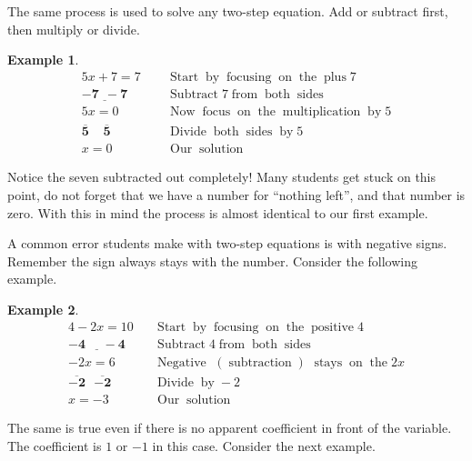 \documentclass[12pt]{book}
\theoremstyle{definition}
\newtheorem{example}{Example}
\newcommand{\tmmathbf}[1]{\ensuremath{\boldsymbol{#1}}}
\newcommand{\tmop}[1]{\ensuremath{\operatorname{#1}}}
\begin{document}
 The same process is used to solve any two-step equation. Add or subtract first, then multiply or divide.
\begin{example}\label{Lin14}
   \begin{eqnarray*}
    5 x + 7 = 7~~ &  & \tmop{Start} \tmop{by} \tmop{focusing} \tmop{on}
    \tmop{the} \tmop{plus} 7\\
    \tmmathbf{\underline{- 7 ~~- 7}} &  & \tmop{Subtract} 7 \tmop{from}
    \tmop{both} \tmop{sides}\\
    5 x = 0~~ &  & \tmop{Now} \tmop{focus} \tmop{on} \tmop{the}
    \tmop{multiplication} \tmop{by} 5\\
    \tmmathbf{\overline{5} ~~~~~ \overline{5}}~~ &  & \tmop{Divide} \tmop{both}
    \tmop{sides} \tmop{by} 5\\
    x = 0~~ &  & \tmop{Our} \tmop{solution}
  \end{eqnarray*}
\end{example}
Notice the seven subtracted out completely! Many students get stuck on this point, do not forget that we have a number for ``nothing left'', and that number is zero. With this in mind the process is almost identical to our first example.\par
A common error students make with two-step equations is with negative signs. Remember the sign always stays with the number. Consider the following example.
\begin{example}\label{Lin15}
   \begin{eqnarray*}
    4 - 2 x = 10 &  & \tmop{Start} \tmop{by} \tmop{focusing} \tmop{on}
    \tmop{the} \tmop{positive} 4\\
    \underline{\tmmathbf{- 4 ~~~~~~- 4}} &  & \tmop{Subtract} 4 \tmop{from}
    \tmop{both} \tmop{sides}\\
    - 2 x = 6~~ &  & \tmop{Negative~} (\tmop{subtraction}) \tmop{~stays} \tmop{on}
    \tmop{the} 2 x\\
    \tmmathbf{\overline{- 2} ~~~ \overline{- 2}} &  & \tmop{Divide} \tmop{by} -
    2\\
    x = - 3 &  & \tmop{Our} \tmop{solution}
  \end{eqnarray*}
\end{example}
The same is true even if there is no apparent coefficient in front of the variable.  The coefficient is $1$ or $-1$ in this case.
Consider the next example.
\end{document}
